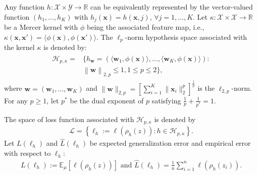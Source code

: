 \documentclass{article}
\begin{document}
Any function $h:\mathcal{X}\times\mathcal{Y}\rightarrow \mathbb{R}$ can be equivalently represented by the vector-valued function
$(h_1,\ldots,h_K)$ with $h_j(\mathbf x)=h(\mathbf x,j)$, $\forall j=1,\ldots,K$.
Let $\kappa:\mathcal{X}\times\mathcal{X}\rightarrow\mathbb{R}$ be a Mercer kernel with $\phi$ being the associated feature map,
i.e., $\kappa(\mathbf x,\mathbf x')=\langle \phi(\mathbf x),\phi(\mathbf x')\rangle$.
The $\ell_p$-norm hypothesis space associated with the kernel $\kappa$ is denoted by:
 \begin{align}
 \label{hypothspapce}
   \begin{aligned}
   \mathcal{H}_{p,\kappa}=&\Big\{h_\mathbf{w}=\left(\langle \mathbf w_1,\phi(\mathbf x)\rangle,\ldots, \langle\mathbf w_K,\phi(\mathbf x)\rangle\right):\\
  & \left\|\mathbf  w \right\|_{2,p}\leq 1, 1\leq p\leq 2
  \Big\},
   \end{aligned}
 \end{align}
 where $\mathbf w=(\mathbf w_1,\ldots,\mathbf w_K)$ and $\|\mathbf w\|_{2,p}=\left[\sum_{i=1}^K\|\mathbf x_i\|_2^p\right]^{\frac{1}{p}}$
 is the $\ell_{2,p}$-norm.
 For any $p\geq 1$, let $p^\ast$ be the dual exponent of $p$ satisfying $\frac{1}{p}+\frac{1}{p^\ast}=1$.

The space of loss function associated with $\mathcal{H}_{p,\kappa}$  is denoted by
\begin{align}
\label{eq-sapce-loss-functions}
  \mathcal{L}=\left\{\ell_h:=\ell(\rho_h(z)):h\in\mathcal{H}_{p,\kappa}\right\}.
\end{align}
Let $L(\ell_h)$ and  $\hat{L}(\ell_h)$ be expected generalization error and
 empirical error  with respect to $\ell_h$:
\begin{align*}
  L(\ell_h):=\mathbb{E}_\mu[\ell(\rho_h(z))] \text{ and } \hat{L}(\ell_h)=\frac{1}{n}\sum_{i=1}^n\ell(\rho_h(z_i)).
\end{align*}




\end{document}
